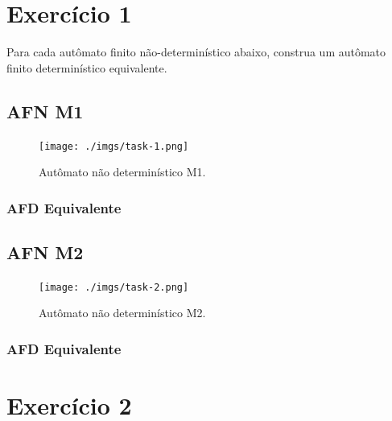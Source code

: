 \documentclass[a4paper, 12pt]{article}
\begin{document}
\newpage
\tableofcontents
\thispagestyle{empty}

\newpage
{}

\newpage
\section{Exercício 1}

Para cada autômato finito não-determinístico abaixo, construa um autômato finito determinístico equivalente.

\subsection{AFN M1}

\begin{figure}[!ht]
    \centering
    \texttt{[image: ./imgs/task-1.png]}
    \caption{Autômato não determinístico M1.}
    \label{fig:m1_m2}
\end{figure}

\subsubsection{AFD Equivalente}

\subsection{AFN M2}

\begin{figure}[!ht]
    \centering
    \texttt{[image: ./imgs/task-2.png]}
    \caption{Autômato não determinístico M2.}
    \label{fig:m1_m2}
\end{figure}

\subsubsection{AFD Equivalente}

\newpage
\section{Exercício 2}
\end{document}
